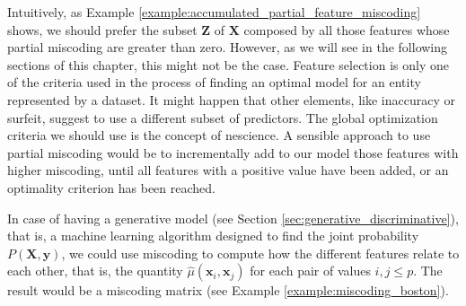 Intuitively, as Example \ref{example:accumulated_partial_feature_miscoding} shows, we should prefer the subset $\mathbf{Z}$ of $\mathbf{X}$ composed by all those features whose partial miscoding are greater than zero. However, as we will see in the following sections of this chapter, this might not be the case. Feature selection is only one of the criteria used in the process of finding an optimal model for an entity represented by a dataset. It might happen that other elements, like inaccuracy or surfeit, suggest to use a different subset of predictors. The global optimization criteria we should use is the concept of nescience. A sensible approach to use partial miscoding would be to incrementally add to our model those features with higher miscoding, until all features with a positive value have been added, or an optimality criterion has been reached.

In case of having a generative model (see Section \ref{sec:generative_discriminative}), that is, a machine learning algorithm designed to find the joint probability $P(\mathbf{X}, \mathbf{y})$, we could use miscoding to compute how the different features relate to each other, that is, the quantity $\hat\mu(\mathbf{x}_i, \mathbf{x}_j)$ for each pair of values $i, j \leq p$. The result would be a miscoding matrix (see Example \ref{example:miscoding_boston}).


